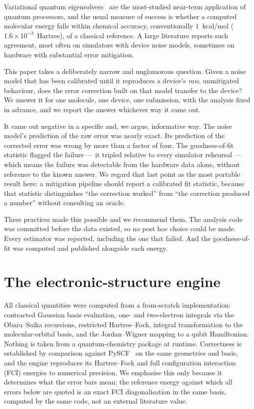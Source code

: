 \documentclass[aps,prx,twocolumn,superscriptaddress,nofootinbib,floatfix]{revtex4-2}
\begin{document}
Variational quantum eigensolvers~\cite{peruzzo2014,mcclean2016} are the
most-studied near-term application of quantum processors, and the usual
measure of success is whether a computed molecular energy falls within
chemical accuracy, conventionally $1$~kcal/mol
($1.6\times10^{-3}$~Hartree), of a classical reference. A large
literature reports such agreement, most often on simulators with device
noise models, sometimes on hardware with substantial error mitigation.

This paper takes a deliberately narrow and unglamorous question. Given a
noise model that has been calibrated until it reproduces a device's
\emph{raw}, unmitigated behaviour, does the error correction built on that
model transfer to the device? We answer it for one molecule, one device,
one submission, with the analysis fixed in advance, and we report the
answer whichever way it came out.

It came out negative in a specific and, we argue, informative way. The
noise model's prediction of the raw error was nearly exact. Its prediction
of the corrected error was wrong by more than a factor of four. The
goodness-of-fit statistic flagged the failure --- it tripled relative to
every simulator rehearsal --- which means the failure was detectable from
the hardware data alone, without reference to the known answer. We regard
that last point as the most portable result here: a mitigation pipeline
should report a calibrated fit statistic, because that statistic
distinguishes ``the correction worked'' from ``the correction produced a
number'' without consulting an oracle.

Three practices made this possible and we recommend them. The analysis
code was committed before the data existed, so no post hoc choice could
be made. Every estimator was reported, including the one that failed.
And the goodness-of-fit was computed and published alongside each energy.

\section{The electronic-structure engine}

All classical quantities were computed from a from-scratch implementation:
contracted Gaussian basis evaluation, one- and two-electron integrals via
the Obara--Saika recursions, restricted Hartree--Fock, integral
transformation to the molecular-orbital basis, and the Jordan--Wigner
mapping to a qubit Hamiltonian. Nothing is taken from a quantum-chemistry
package at runtime. Correctness is established by comparison against
PySCF~\cite{pyscf} on the same geometries and basis, and the engine
reproduces its Hartree--Fock and full configuration interaction (FCI)
energies to numerical precision. We emphasise this only because it
determines what the error bars mean: the reference energy against which
all errors below are quoted is an exact FCI diagonalisation in the same
basis, computed by the same code, not an external literature value.
\end{document}
